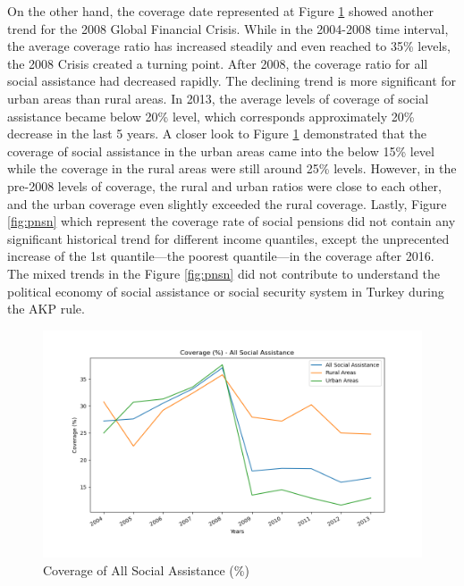 \documentclass[11pt]{article}
\begin{document}
\noindent On the other hand, the coverage date represented at Figure \ref{fig:cvrg} showed another trend for the 2008 Global Financial Crisis. While in the 2004-2008 time interval, the average coverage ratio has increased steadily and even reached to 35\% levels, the 2008 Crisis created a turning point. After 2008, the coverage ratio for all social assistance had decreased rapidly. The declining trend is more significant for urban areas than rural areas. In 2013, the average levels of coverage of social assistance became below 20\% level, which corresponds approximately 20\% decrease in the last 5 years. A closer look to Figure \ref{fig:cvrg} demonstrated that the coverage of social assistance in the urban areas came into the below 15\% level while the coverage in the rural areas were still around 25\% levels. However, in the pre-2008 levels of coverage, the rural and urban ratios were close to each other, and the urban coverage even slightly exceeded the rural coverage. Lastly, Figure \ref{fig:pnsn} which represent the coverage rate of social pensions did not contain any significant historical trend for different income quantiles, except the unprecented increase of the 1st quantile—the poorest quantile—in the coverage after 2016. The mixed trends in the Figure \ref{fig:pnsn} did not contribute to understand the political economy of social assistance or social security system in Turkey during the AKP rule.

\begin{figure}[htbp]
    \begin{center}
    \includegraphics[width=6in]{cvrg_asst.png}
    \caption{Coverage of All Social Assistance (\%)}
    \label{fig:cvrg}
    \end{center}
\end{figure}
\end{document}
